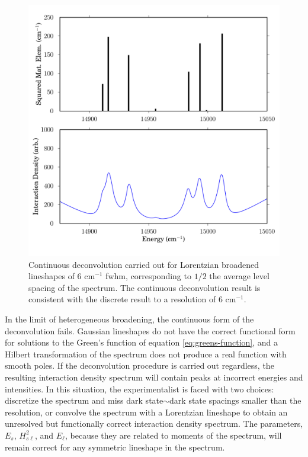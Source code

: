 \documentclass[12pt]{mitthesis}
\begin{document}
\begin{figure}
  \caption{Continuous deconvolution carried out for Lorentzian
    broadened lineshapes of 6 cm$^{-1}$ fwhm, corresponding to $1/2$
    the average level spacing of the spectrum.  The continuous
    deconvolution result is consistent with the discrete result to a
    resolution of 6 cm$^{-1}$.  }
  \label{fig:broadened}
  \centering
  \includegraphics[width=6in]{smalley-compare-fwhm6.png}
\end{figure}

In the limit of heterogeneous broadening, the continuous form of the
deconvolution fails.  Gaussian lineshapes do not have the correct
functional form for solutions to the Green's function of equation
\ref{eq:greens-function}, and a Hilbert transformation of the spectrum
does not produce a real function with smooth poles.  If the
deconvolution procedure is carried out regardless, the resulting
interaction density spectrum will contain peaks at incorrect energies
and intensities.  In this situation, the experimentalist is faced with
two choices: discretize the spectrum and miss dark state$\sim$dark
state spacings smaller than the resolution, or convolve the spectrum
with a Lorentzian lineshape to obtain an unresolved but functionally
correct interaction density spectrum.  The parameters, $E_s$,
$H_{s\ell}^2$, and $E_{\ell}$, because they are related to moments of
the spectrum, will remain correct for any symmetric lineshape in the
spectrum.
\end{document}
